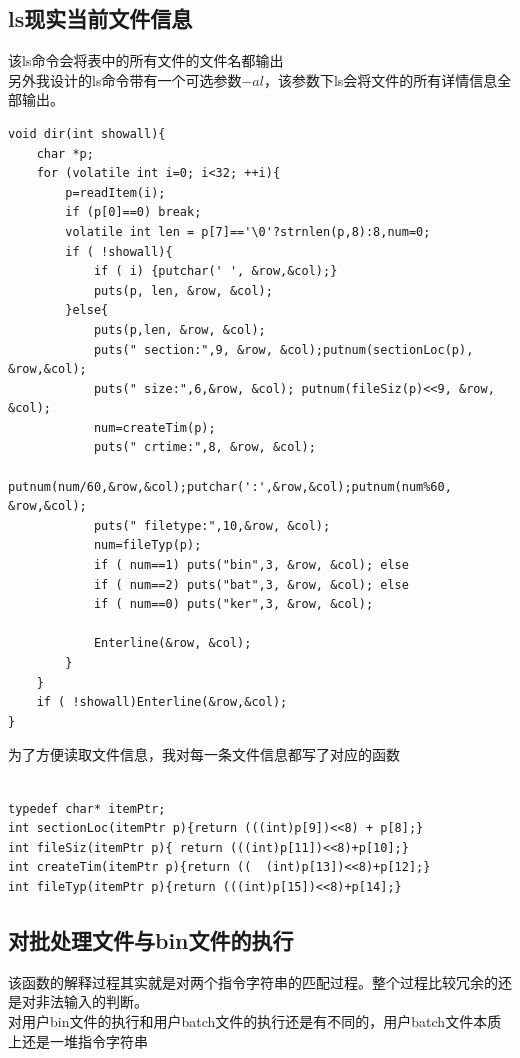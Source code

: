 \documentclass[a4paper,11pt,UTF8]{ctexart}
\begin{document}
      \subsection{ls现实当前文件信息}
      该ls命令会将表中的所有文件的文件名都输出\\
      另外我设计的ls命令带有一个可选参数$-al$，该参数下ls会将文件的所有详情信息全部输出。\\
      \begin{lstlisting}[caption={dir()函数},captionpos=b]
void dir(int showall){
	char *p;
	for (volatile int i=0; i<32; ++i){
		p=readItem(i);
		if (p[0]==0) break;
		volatile int len = p[7]=='\0'?strnlen(p,8):8,num=0;
		if ( !showall){
			if ( i) {putchar(' ', &row,&col);}
			puts(p, len, &row, &col);
		}else{
			puts(p,len, &row, &col);
			puts(" section:",9, &row, &col);putnum(sectionLoc(p), &row,&col);
			puts(" size:",6,&row, &col); putnum(fileSiz(p)<<9, &row, &col);
			num=createTim(p);
			puts(" crtime:",8, &row, &col);
			putnum(num/60,&row,&col);putchar(':',&row,&col);putnum(num%60, &row,&col);
			puts(" filetype:",10,&row, &col);
			num=fileTyp(p);
			if ( num==1) puts("bin",3, &row, &col);	else
			if ( num==2) puts("bat",3, &row, &col);	else
			if ( num==0) puts("ker",3, &row, &col);
			
			Enterline(&row, &col);
		}
	}
	if ( !showall)Enterline(&row,&col);
}
      \end{lstlisting}
      为了方便读取文件信息，我对每一条文件信息都写了对应的函数    
      \begin{lstlisting}[caption={文件条目读取},captionpos=b]

typedef char* itemPtr;
int sectionLoc(itemPtr p){return (((int)p[9])<<8) + p[8];}
int fileSiz(itemPtr p){ return (((int)p[11])<<8)+p[10];}
int createTim(itemPtr p){return ((  (int)p[13])<<8)+p[12];}
int fileTyp(itemPtr p){return (((int)p[15])<<8)+p[14];}
      \end{lstlisting}
      \subsection{对批处理文件与bin文件的执行}
      该函数的解释过程其实就是对两个指令字符串的匹配过程。整个过程比较冗余的还是对非法输入的判断。\\
      对用户bin文件的执行和用户batch文件的执行还是有不同的，用户batch文件本质上还是一堆指令字符串\\
\end{document}
